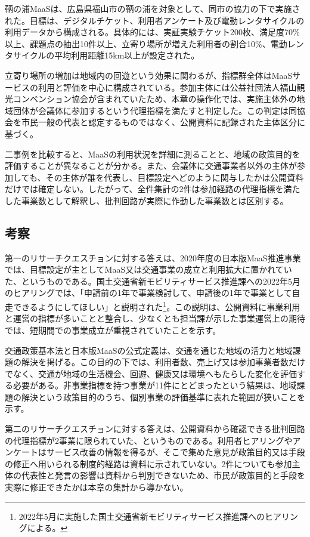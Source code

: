鞆の浦MaaSは、広島県福山市の鞆の浦を対象として、同市の協力の下で実施された。目標は、デジタルチケット、利用者アンケート及び電動レンタサイクルの利用データから構成される。具体的には、実証実験チケット200枚、満足度70\%以上、課題点の抽出10件以上、立寄り場所が増えた利用者の割合10\%、電動レンタサイクルの平均利用距離15km以上が設定された。

立寄り場所の増加は地域内の回遊という効果に関わるが、指標群全体はMaaSサービスの利用と評価を中心に構成されている。参加主体には公益社団法人福山観光コンベンション協会が含まれていたため、本章の操作化では、実施主体外の地域団体が会議体に参加するという代理指標を満たすと判定した。この判定は同協会を市民一般の代表と認定するものではなく、公開資料に記録された主体区分に基づく。

二事例を比較すると、MaaSの利用状況を詳細に測ることと、地域の政策目的を評価することが異なることが分かる。また、会議体に交通事業者以外の主体が参加しても、その主体が誰を代表し、目標設定へどのように関与したかは公開資料だけでは確定しない。したがって、全件集計の2件は参加経路の代理指標を満たした事業数として解釈し、批判回路が実際に作動した事業数とは区別する。

\subsection{考察}
\label{subsec:ch4_discussion}

第一のリサーチクエスチョンに対する答えは、2020年度の日本版MaaS推進事業では、目標設定が主としてMaaS又は交通事業の成立と利用拡大に置かれていた、というものである。国土交通省新モビリティサービス推進課への2022年5月のヒアリングでは、「申請前の1年で事業検討して、申請後の1年で事業として自走できるようにしてほしい」と説明された\footnote{2022年5月に実施した国土交通省新モビリティサービス推進課へのヒアリングによる。}。この説明は、公開資料に事業利用と運営の指標が多いことと整合し、少なくとも担当課が示した事業運営上の期待では、短期間での事業成立が重視されていたことを示す。

交通政策基本法と日本版MaaSの公式定義は、交通を通じた地域の活力と地域課題の解決を掲げる。この目的の下では、利用者数、売上げ又は参加事業者数だけでなく、交通が地域の生活機会、回遊、健康又は環境へもたらした変化を評価する必要がある。非事業指標を持つ事業が11件にとどまったという結果は、地域課題の解決という政策目的のうち、個別事業の評価基準に表れた範囲が狭いことを示す。

第二のリサーチクエスチョンに対する答えは、公開資料から確認できる批判回路の代理指標が2事業に限られていた、というものである。利用者ヒアリングやアンケートはサービス改善の情報を得るが、そこで集めた意見が政策目的又は手段の修正へ用いられる制度的経路は資料に示されていない。2件についても参加主体の代表性と発言の影響は資料から判別できないため、市民が政策目的と手段を実際に修正できたかは本章の集計から導かない。

